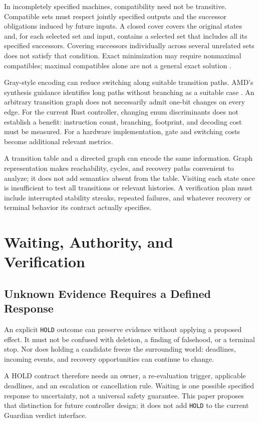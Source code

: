 \documentclass[11pt]{article}
\begin{document}
In incompletely specified machines, compatibility need not be transitive. Compatible sets must respect jointly specified outputs and the successor obligations induced by future inputs. A closed cover covers the original states and, for each selected set and input, contains a selected set that includes all its specified successors. Covering successors individually across several unrelated sets does not satisfy that condition. Exact minimization may require nonmaximal compatibles; maximal compatibles alone are not a general exact solution \cite{paull1959,grasselli1965,berkeley1996}.

Gray-style encoding can reduce switching along suitable transition paths. AMD's synthesis guidance identifies long paths without branching as a suitable case \cite{amd-gray}. An arbitrary transition graph does not necessarily admit one-bit changes on every edge. For the current Rust controller, changing enum discriminants does not establish a benefit: instruction count, branching, footprint, and decoding cost must be measured. For a hardware implementation, gate and switching costs become additional relevant metrics.

A transition table and a directed graph can encode the same information. Graph representation makes reachability, cycles, and recovery paths convenient to analyze; it does not add semantics absent from the table. Visiting each state once is insufficient to test all transitions or relevant histories. A verification plan must include interrupted stability streaks, repeated failures, and whatever recovery or terminal behavior its contract actually specifies.

\section{Waiting, Authority, and Verification}
\subsection{Unknown Evidence Requires a Defined Response}
An explicit \texttt{HOLD} outcome can preserve evidence without applying a proposed effect. It must not be confused with deletion, a finding of falsehood, or a terminal stop. Nor does holding a candidate freeze the surrounding world: deadlines, incoming events, and recovery opportunities can continue to change.

A HOLD contract therefore needs an owner, a re-evaluation trigger, applicable deadlines, and an escalation or cancellation rule. Waiting is one possible specified response to uncertainty, not a universal safety guarantee. This paper proposes that distinction for future controller design; it does not add \texttt{HOLD} to the current Guardian verdict interface.
\end{document}
